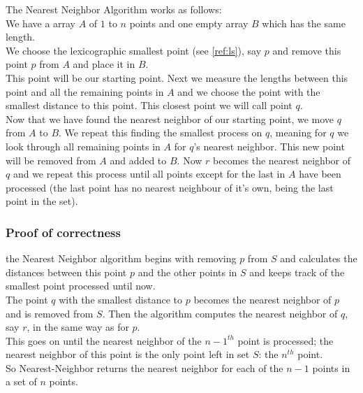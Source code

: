       The Nearest Neighbor Algorithm works as follows:\\
      We have a array $A$ of $1$ to $n$ points and one empty array $B$ which has the same length.\\
      We choose the lexicographic smallest point (see \ref{ref:ls}), say $p$ and remove this point $p$ from $A$ and place it in $B$.\\
      This point will be our starting point. Next we measure the lengths between this point
      and all the remaining points in $A$ and we choose the point with the smallest distance to this point.
      This closest point we will call point $q$.\\
      Now that we have found the nearest neighbor of our starting point, we move $q$ from $A$ to $B$. We repeat this finding the smallest process on $q$, meaning for $q$ we look through all remaining points in $A$ for $q$'s nearest neighbor. This new point will be removed from $A$ and added to $B$. Now $r$ becomes the nearest neighbor of $q$ and we repeat this process until all points except for the last in $A$ have been processed (the last point has no nearest neighbour of it's own, being the last point in the set).

    \subsubsection{Proof of correctness}
    \label{ssub:proof}
      the Nearest Neighbor algorithm begins with removing $p$ from $S$ and calculates the distances between this point $p$ and the other points in $S$ and keeps track of the smallest point processed until now.\\ The point $q$ with the smallest distance to $p$ becomes the nearest neighbor of $p$ and is removed from $S$.
      Then the algorithm computes the nearest neighbor of $q$, say $r$, in the same way as for $p$.\\
      This goes on until the nearest neighbor of the $n-1^{th}$ point is processed; the nearest neighbor of this point is the only point left in set $S$: the $n^{th}$ point.\\
      So Nearest-Neighbor returns the nearest neighbor for each of the $n-1$ points in a set of $n$ points.

